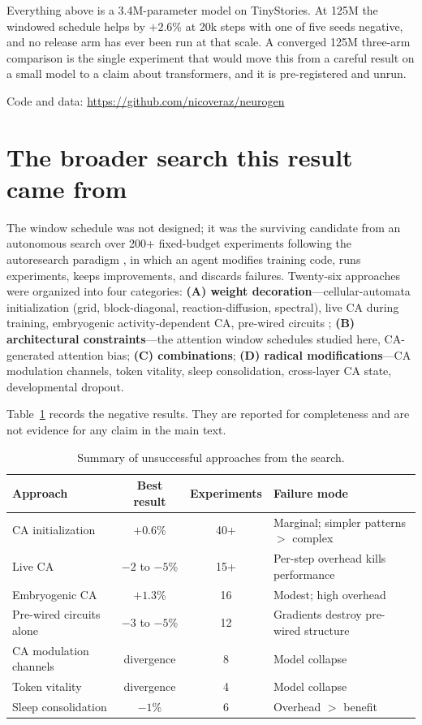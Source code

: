 \documentclass[11pt,a4paper]{article}
\begin{document}
Everything above is a 3.4M-parameter model on TinyStories. At 125M the windowed schedule helps by $+2.6$\% at 20k steps with one of five seeds negative, and no release arm has ever been run at that scale. A converged 125M three-arm comparison is the single experiment that would move this from a careful result on a small model to a claim about transformers, and it is pre-registered and unrun.

Code and data: \url{https://github.com/nicoveraz/neurogen}

\appendix

\section{The broader search this result came from}
\label{app:search}

The window schedule was not designed; it was the surviving candidate from an autonomous search over 200+ fixed-budget experiments following the autoresearch paradigm \citep{karpathy2026autoresearch}, in which an agent modifies training code, runs experiments, keeps improvements, and discards failures. Twenty-six approaches were organized into four categories: \textbf{(A) weight decoration}---cellular-automata initialization (grid, block-diagonal, reaction-diffusion, spectral), live CA during training, embryogenic activity-dependent CA, pre-wired circuits \citep{olsson2022incontext,anthropic2025circuits,mordvintsev2020growing,najarro2022hypernca}; \textbf{(B) architectural constraints}---the attention window schedules studied here, CA-generated attention bias; \textbf{(C) combinations}; \textbf{(D) radical modifications}---CA modulation channels, token vitality, sleep consolidation, cross-layer CA state, developmental dropout.

Table~\ref{tab:failures} records the negative results. They are reported for completeness and are not evidence for any claim in the main text.

\begin{table}[H]
\centering
\caption{Summary of unsuccessful approaches from the search.}
\label{tab:failures}
\begin{tabular}{lccl}
\toprule
Approach & Best result & Experiments & Failure mode \\
\midrule
CA initialization & $+0.6$\% & 40+ & Marginal; simpler patterns $>$ complex \\
Live CA & $-2$ to $-5$\% & 15+ & Per-step overhead kills performance \\
Embryogenic CA & $+1.3$\% & 16 & Modest; high overhead \\
Pre-wired circuits alone & $-3$ to $-5$\% & 12 & Gradients destroy pre-wired structure \\
CA modulation channels & divergence & 8 & Model collapse \\
Token vitality & divergence & 4 & Model collapse \\
Sleep consolidation & $-1$\% & 6 & Overhead $>$ benefit \\
\bottomrule
\end{tabular}
\end{table}
\end{document}
